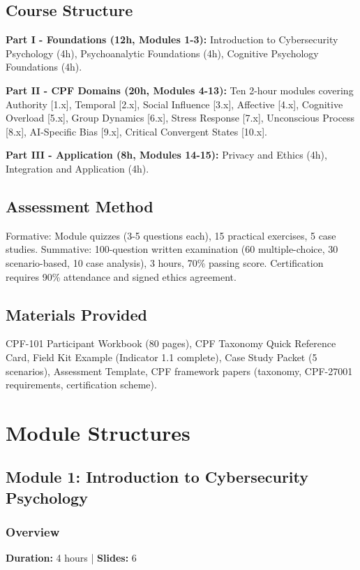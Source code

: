 \documentclass[11pt,a4paper]{article}
\begin{document}
\subsection{Course Structure}
\textbf{Part I - Foundations (12h, Modules 1-3):} Introduction to Cybersecurity Psychology (4h), Psychoanalytic Foundations (4h), Cognitive Psychology Foundations (4h).

\textbf{Part II - CPF Domains (20h, Modules 4-13):} Ten 2-hour modules covering Authority [1.x], Temporal [2.x], Social Influence [3.x], Affective [4.x], Cognitive Overload [5.x], Group Dynamics [6.x], Stress Response [7.x], Unconscious Process [8.x], AI-Specific Bias [9.x], Critical Convergent States [10.x].

\textbf{Part III - Application (8h, Modules 14-15):} Privacy and Ethics (4h), Integration and Application (4h).

\subsection{Assessment Method}
Formative: Module quizzes (3-5 questions each), 15 practical exercises, 5 case studies. Summative: 100-question written examination (60 multiple-choice, 30 scenario-based, 10 case analysis), 3 hours, 70\% passing score. Certification requires 90\% attendance and signed ethics agreement.

\subsection{Materials Provided}
CPF-101 Participant Workbook (80 pages), CPF Taxonomy Quick Reference Card, Field Kit Example (Indicator 1.1 complete), Case Study Packet (5 scenarios), Assessment Template, CPF framework papers (taxonomy, CPF-27001 requirements, certification scheme).

\newpage

\section{Module Structures}

\subsection{Module 1: Introduction to Cybersecurity Psychology}

\subsubsection{Overview}
\textbf{Duration:} 4 hours | \textbf{Slides:} 6
\end{document}
